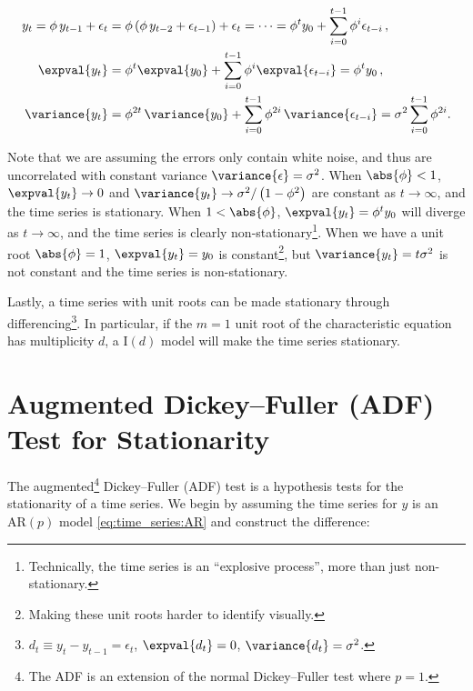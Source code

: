 \begin{subequations}\label{eq:time_series:unit_root_ex}
\begin{align}
y_{t}
= \phi\, y_{t-1} + \epsilon_{t}
&= \phi \left(\phi\, y_{t-2} + \epsilon_{t-1}\right) + \epsilon_{t}
= \cdots
= \phi^{t} y_{0} + \sum_{i=0}^{t-1} \phi^{i} \epsilon_{t-i}\,, \label{eq:time_series:unit_root_ex:expand} \\
\expval{y_{t}}
&= \phi^{t} \expval{y_{0}} + \sum_{i=0}^{t-1} \phi^{i} \expval{\epsilon_{t-i}}
= \phi^{t} y_{0}\,, \label{eq:time_series:unit_root_ex:expval} \\
\variance{y_{t}}
&= \phi^{2t}\, \variance{y_{0}} + \sum_{i=0}^{t-1} \phi^{2i}\, \variance{\epsilon_{t-i}}
= \sigma^{2} \sum_{i=0}^{t-1} \phi^{2i}. \label{eq:time_series:unit_root_ex:var}
\end{align}
\end{subequations}

\noindent Note that we are assuming the errors only contain white noise,
and thus are uncorrelated with constant variance $\variance{\epsilon} = \sigma^{2}$.
When $\abs{\phi} < 1$, $\expval{y_{t}} \to 0$ and
$\variance{y_{t}} \to \sigma^{2}/\left(1-\phi^{2}\right)$ are constant
as $t \to \infty$, and the time series is stationary.
When $1 < \abs{\phi}$, $\expval{y_{t}} = \phi^{t} y_{0}$
will diverge as $t \to \infty$, and the time series is clearly non-stationary\footnote{Technically,
the time series is an ``explosive process'', more than just non-stationary.}.
When we have a unit root $\abs{\phi} = 1$,
$\expval{y_{t}} = y_{0}$ is constant\footnote{Making these unit roots harder to identify visually.},
but $\variance{y_{t}} = t \sigma^{2}$ is not constant and the time series is non-stationary.

Lastly, a time series with unit roots can be made stationary through
differencing\footnote{$d_{t} \equiv y_{t} - y_{t-1} = \epsilon_{t}$, $\expval{d_{t}} = 0$, $\variance{d_{t}} = \sigma^{2}$.}.
In particular, if the $m=1$ unit root of the characteristic equation has multiplicity $d$,
a $\text{I}\left(d\right)$ model will make the time series stationary.

\section{Augmented Dickey--Fuller (ADF) Test for Stationarity}
\label{time_series:ADF}

The augmented\footnote{The ADF is an extension of the normal Dickey--Fuller test where $p = 1$.} Dickey--Fuller (ADF) test
is a hypothesis tests for the stationarity of a time series.
We begin by assuming the time series for $y$ is an $\text{AR}\left(p\right)$ model \cref{eq:time_series:AR}
and construct the difference:

